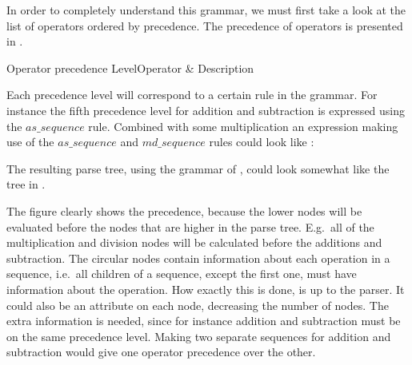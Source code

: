 In order to completely understand this grammar, we must first take a look at the list of
operators ordered by precedence. The precedence of operators is presented in
.

                  {Operator precedence}
           {Level}{Operator & Description}{
}

Each precedence level will correspond to a certain rule in the grammar. For
instance the fifth precedence level for addition and subtraction is expressed
using the $as\_sequence$ rule. Combined with some multiplication an expression
making use of the $as\_sequence$ and $md\_sequence$ rules could look like
:


The resulting parse tree, using the grammar of \productname{}, could look
somewhat like the tree in .



The figure clearly shows the precedence, because the lower nodes will be
evaluated before the nodes that are higher in the parse tree. E.g.\ all of the
multiplication and division nodes will be calculated before the additions and
subtraction. The circular nodes contain information about each operation in a
sequence, i.e.\ all children of a sequence, except the first one, must have
information about the operation. How exactly this is done, is up to the parser.
It could also be an attribute on each node, decreasing the number of nodes. The
extra information is needed, since for instance addition and subtraction must be
on the same precedence level. Making two separate sequences for addition and
subtraction would give one operator precedence over the other.

